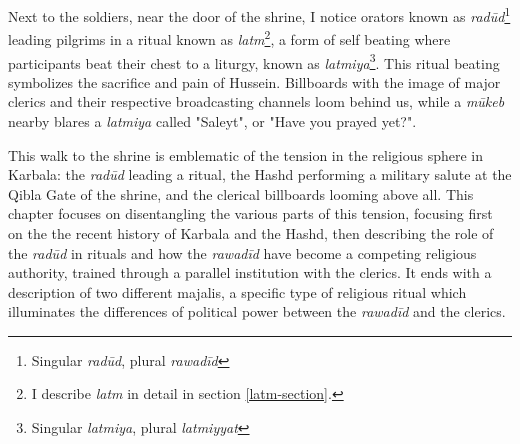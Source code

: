 Next to the soldiers, near the door of the shrine, I notice orators known as \emph{radūd}\footnote{Singular \emph{radūd}, plural \emph{rawadīd}} leading pilgrims in a ritual known as \emph{latm}\footnote{I describe \emph{latm} in detail in section \ref{latm-section}.}, a form of self beating where participants beat their chest to a liturgy, known as \emph{latmiya}\footnote{Singular \emph{latmiya}, plural \emph{latmiyyat}}. This ritual beating symbolizes the sacrifice and pain of Hussein. Billboards with the image of major clerics and their respective broadcasting channels loom behind us, while a \emph{mūkeb} nearby blares a \emph{latmiya} called "Saleyt", or "Have you prayed yet?". 


This walk to the shrine is emblematic of the tension in the religious sphere in Karbala: the \emph{radūd} leading a ritual, the Hashd performing a military salute at the Qibla Gate of the shrine, and the clerical billboards looming above all. This chapter focuses on disentangling the various parts of this tension, focusing first on the the recent history of Karbala and the Hashd, then describing the role of the \emph{radūd} in rituals and how the \emph{rawadīd} have become a competing religious authority, trained through a parallel institution with the clerics. It ends with a description of two different majalis, a specific type of religious ritual which illuminates the differences of political power between the \emph{rawadīd} and the clerics. 




